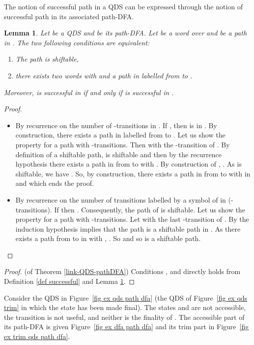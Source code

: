 \documentclass[11pt]{elsarticle}
\newtheorem{lemma}{Lemma}
\newcommand\modif[2]{{#2}}
\begin{document}
The notion of successful path in a QDS can be expressed through the notion of successful path in its associated path-DFA.

\begin{lemma}\label{lem-shift}
 Let  be a QDS and  be its path-DFA. Let  be a word over  and  be a path in . The two following conditions are equivalent:
  \begin{enumerate}
    \item The path  is shiftable,
    \item  there exists two words  with  and a path  in  labelled  from  to .
  \end{enumerate}
  Moreover,  is successful in  if and only if  is successful in .
\end{lemma}
\begin{proof}
\ \\
\begin{itemize}
\item[] By recurrence on the number  of -transitions in . If , then  is in . By construction, there exists a path  in  labelled  from  to . Let us show the property for a path with  -transitions. Then   with  the  -transition of . By definition of a shiftable path,  is shiftable and then by the recurrence hypothesis there exists a path in  from  to  with .
By construction of , . As  is shiftable, we have . So, by construction, there exists a path in  from  to  with  in  and  which ends the proof.
\item[] By recurrence on the number  of transitions labelled by a symbol of  in  (-transitions). If  then . Consequently, the path  of  is shiftable. Let us show the property for a path with  -transitions. Let    with   the last -transition of . By the induction hypothesis   implies that the path  is a shiftable path in . As there exists a path from  to  in  with , . So  and so  is a shiftable path.
\end{itemize}
\end{proof}
\begin{proof}(of Theorem \ref{link-QDS-pathDFA})
Conditions ,  and  directly holds  from Definition \ref{def successful} and Lemma \ref{lem-shift}.
\end{proof}








\begin{example}\label{ex path DFA}
  Consider the QDS in Figure~\ref{fig ex qds path dfa} \modif{}{(the  QDS of  Figure~\ref{fig ex qds trim} in which the state  has been made final)}.  The states  and  are not accessible, the transition  is not useful, and neither is the finality of . The accessible part of its path-DFA is given Figure~\ref{fig ex dfa path dfa} and its trim part in Figure~\ref{fig ex trim qds path dfa}.
\end{example}  
\end{document}
